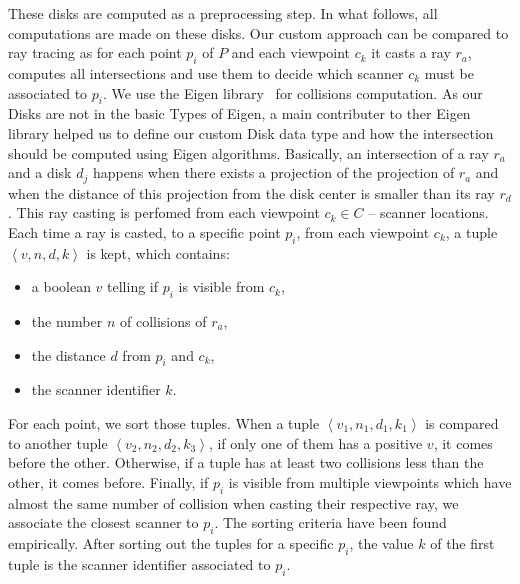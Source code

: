 These disks are computed as a preprocessing step. In what follows, all computations are made on these disks. Our custom approach can be compared to ray tracing as for each point $p_i$ of $P$ and each viewpoint $c_k$ it casts a ray $r_a$, computes all intersections and use them to decide which scanner $c_k$ must be associated to $p_i$. We use the Eigen library~\cite{eigenweb} for collisions computation. As our Disks are not in the basic Types of Eigen, a main contributer to ther Eigen library helped us to define our custom Disk data type and how the intersection should be computed using Eigen algorithms. Basically, an intersection of a ray $r_a$ and a disk $d_j$ happens when there exists a projection of the projection of $r_a$ and when the distance of this projection from the disk center is smaller than its ray $r_d$. This ray casting is perfomed from each viewpoint $c_k \in C$ -- scanner locations. Each time a ray is casted, to a specific point $p_i$, from each viewpoint $c_k$, a tuple $\left\langle v, n, d, k \right\rangle$ is kept, which contains:
\begin{itemize}
  \item a boolean $v$ telling if $p_i$ is visible from $c_k$,
  \item the number $n$ of collisions of $r_a$,
  \item the distance $d$ from $p_i$ and $c_k$,
  \item the scanner identifier $k$.
\end{itemize}

For each point, we sort those tuples. When a tuple $\left\langle v_1, n_1, d_1, k_1 \right\rangle$ is compared to another tuple $\left \langle v_2, n_2, d_2, k_3 \right\rangle$, if only one of them  has a positive $v$, it comes before the other. Otherwise, if a tuple has at least two collisions less than the other, it comes before. Finally, if $p_i$ is visible from multiple viewpoints which have almost the same number of collision when casting their respective ray, we associate the closest
scanner to $p_i$. The sorting criteria have been found empirically. After sorting out the tuples for a specific $p_i$, the value $k$ of the first tuple is the scanner identifier associated to $p_i$.


